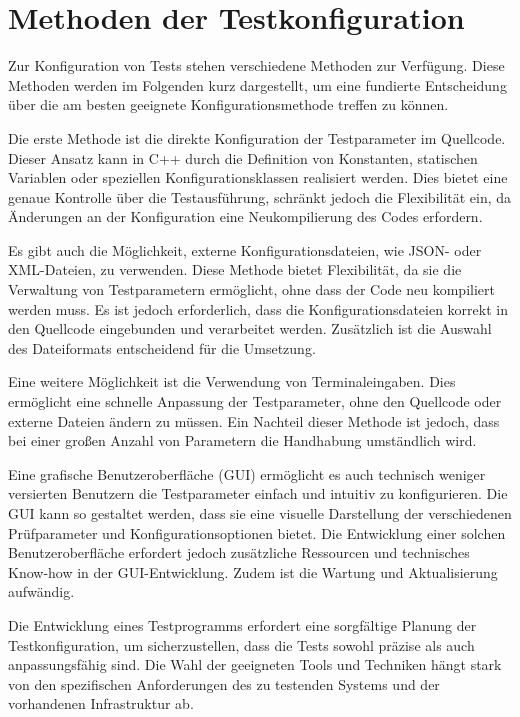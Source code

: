 \section{Methoden der Testkonfiguration}

Zur Konfiguration von Tests stehen verschiedene Methoden zur Verfügung. Diese Methoden werden im Folgenden kurz dargestellt, 
um eine fundierte Entscheidung über die am besten geeignete Konfigurationsmethode treffen zu können.

Die erste Methode ist die direkte Konfiguration der Testparameter im Quellcode. Dieser Ansatz kann in C++ durch die Definition von Konstanten, statischen Variablen 
oder speziellen Konfigurationsklassen realisiert werden. Dies bietet eine genaue Kontrolle über die Testausführung, schränkt jedoch die Flexibilität ein, da Änderungen 
an der Konfiguration eine Neukompilierung des Codes erfordern.

Es gibt auch die Möglichkeit, externe Konfigurationsdateien, wie JSON- oder XML-Dateien, zu verwenden. Diese Methode bietet Flexibilität, da sie die Verwaltung von Testparametern ermöglicht, 
ohne dass der Code neu kompiliert werden muss. Es ist jedoch erforderlich, dass die Konfigurationsdateien korrekt in den Quellcode eingebunden und verarbeitet werden. Zusätzlich
ist die Auswahl des Dateiformats entscheidend für die Umsetzung.

Eine weitere Möglichkeit ist die Verwendung von Terminaleingaben. Dies ermöglicht eine schnelle Anpassung der Testparameter, ohne den 
Quellcode oder externe Dateien ändern zu müssen. Ein Nachteil dieser Methode ist jedoch, dass bei einer großen Anzahl von Parametern die Handhabung umständlich wird.

Eine grafische Benutzeroberfläche (\acs{GUI}) ermöglicht es auch technisch weniger versierten Benutzern die Testparameter einfach und intuitiv zu konfigurieren. 
Die \acs{GUI} kann so gestaltet werden, dass sie eine visuelle Darstellung der verschiedenen Prüfparameter und Konfigurationsoptionen bietet. Die Entwicklung einer solchen 
Benutzeroberfläche erfordert jedoch zusätzliche Ressourcen und technisches Know-how in der \acs{GUI}-Entwicklung. Zudem ist die Wartung und Aktualisierung aufwändig.

Die Entwicklung eines Testprogramms erfordert eine sorgfältige Planung der Testkonfiguration, um sicherzustellen, dass die Tests sowohl präzise als auch 
anpassungsfähig sind. Die Wahl der geeigneten Tools und Techniken hängt stark von den spezifischen Anforderungen des zu testenden Systems und der vorhandenen Infrastruktur ab.

\citep{Witte2019} \citep{Beneken2022}